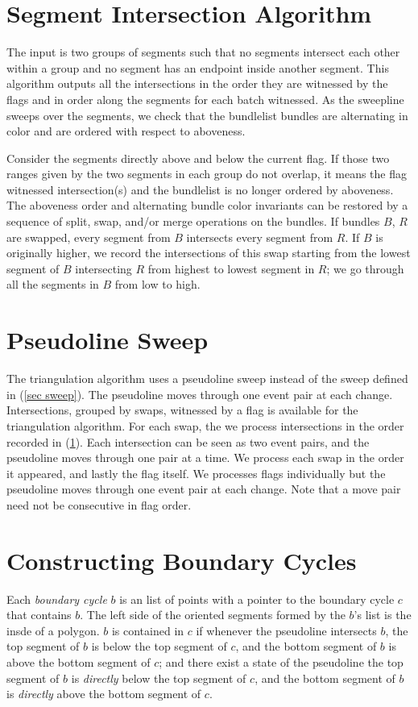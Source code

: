 \documentclass[11pt]{article}
\begin{document}
\section{Segment Intersection Algorithm} \label{sec inter}
The input is two groups of segments such that no segments intersect each other within a group and no segment has an endpoint inside another segment.
This algorithm outputs all the intersections in the order they are witnessed by the flags and in order along the segments for each batch witnessed.
As the sweepline sweeps over the segments, we check that the bundlelist bundles are alternating in color and are ordered with respect to aboveness.

Consider the segments directly above and below the current flag. 
If those two ranges given by the two segments in each group do not overlap, it means the flag witnessed intersection(s) and the bundlelist is no longer ordered by aboveness.
The aboveness order and alternating bundle color invariants can be restored by a sequence of split, swap, and/or merge operations on the bundles.
If bundles $B$, $R$ are swapped, every segment from $B$ intersects every segment from $R$.
If $B$ is originally higher, we record the intersections of this swap starting from the lowest segment of $B$ intersecting $R$ from highest to lowest segment in $R$; we go through all the segments in $B$ from low to high.

\section{Pseudoline Sweep} \label{sec pseudo}
The triangulation algorithm uses a pseudoline sweep instead of the sweep defined in (\ref{sec sweep}).
The pseudoline moves through one event pair at each change.
Intersections, grouped by swaps, witnessed by a flag is available for the triangulation algorithm.
For each swap, the we process intersections in the order recorded in (\ref{sec inter}).
Each intersection can be seen as two event pairs, and the pseudoline moves through one pair at a time.
We process each swap in the order it appeared, and lastly the flag itself.
We processes flags individually but the pseudoline moves through one event pair at each change.
Note that a move pair need not be consecutive in flag order.

\section{Constructing Boundary Cycles} \label{sec bcycle}
Each \textit{boundary cycle} $b$ is an list of points with a pointer to the boundary cycle $c$ that contains $b$.
The left side of the oriented segments formed by the $b$'s list is the insde of a polygon.
$b$ is contained in $c$ if whenever the pseudoline intersects $b$, the top segment of $b$ is below the top segment of $c$, and the bottom segment of $b$ is above the bottom segment of $c$; and there exist a state of the pseudoline the top segment of $b$ is \textit{directly} below the top segment of $c$, and the bottom segment of $b$ is \textit{directly} above the bottom segment of $c$.
\end{document}
